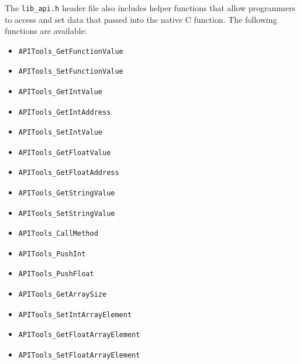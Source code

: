 \documentclass[11pt]{article}
\begin{document}
The \texttt{lib\_api.h} header file also includes helper functions
that allow programmers to access and set data that passed into the
native C function.  The following functions are available: 

\begin{itemize}
\item \begin{verbatim}APITools_GetFunctionValue\end{verbatim}
\item \begin{verbatim}APITools_SetFunctionValue\end{verbatim}
\item \begin{verbatim}APITools_GetIntValue\end{verbatim}
\item \begin{verbatim}APITools_GetIntAddress\end{verbatim}
\item \begin{verbatim}APITools_SetIntValue\end{verbatim}
\item \begin{verbatim}APITools_GetFloatValue\end{verbatim}
\item \begin{verbatim}APITools_GetFloatAddress\end{verbatim}
\item \begin{verbatim}APITools_GetStringValue\end{verbatim}
\item \begin{verbatim}APITools_SetStringValue\end{verbatim}
\item \begin{verbatim}APITools_CallMethod\end{verbatim}
\item \begin{verbatim}APITools_PushInt\end{verbatim}
\item \begin{verbatim}APITools_PushFloat\end{verbatim}
\item \begin{verbatim}APITools_GetArraySize\end{verbatim}
\item \begin{verbatim}APITools_SetIntArrayElement\end{verbatim}
\item \begin{verbatim}APITools_GetFloatArrayElement\end{verbatim}
\item \begin{verbatim}APITools_SetFloatArrayElement\end{verbatim}
\end{itemize}
\end{document}
